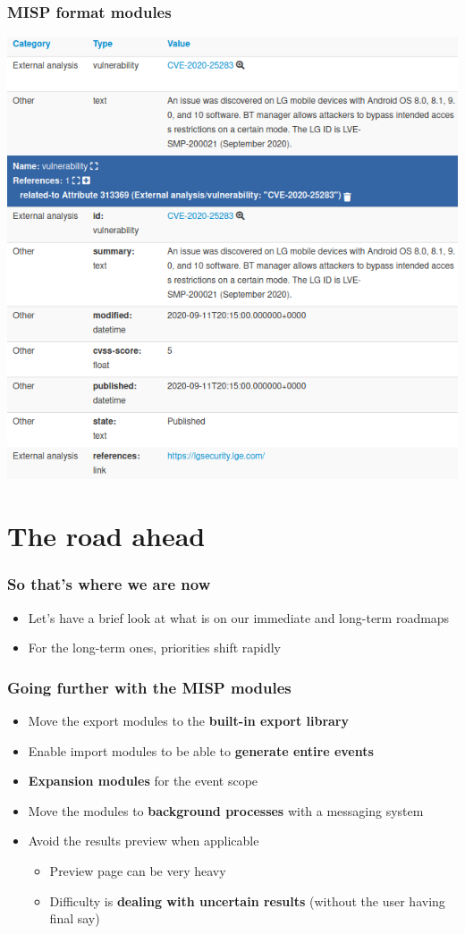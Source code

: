 \begin{frame}
\frametitle{MISP format modules}
\begin{center}
    \includegraphics[width=0.7\linewidth]{cve_module.png}
\end{center}
\end{frame}

\section{The road ahead}

\begin{frame}
\frametitle{So that's where we are now}
\begin{itemize}
	\item Let's have a brief look at what is on our immediate and long-term roadmaps
        \item For the long-term ones, priorities shift rapidly
\end{itemize}
\end{frame}

\begin{frame}
\frametitle{Going further with the MISP modules}
\begin{itemize}
    \item Move the export modules to the {\bf built-in export library}
    \item Enable import modules to be able to {\bf generate entire events}
    \item {\bf Expansion modules} for the event scope
\end{itemize}
\begin{itemize}
    \item Move the modules to {\bf background processes} with a
messaging system
    \item Avoid the results preview when applicable
    \begin{itemize}
        \item Preview page can be very heavy
        \item Difficulty is {\bf dealing with uncertain results} (without the user
having final say)
    \end{itemize}
\end{itemize}
\end{frame}

